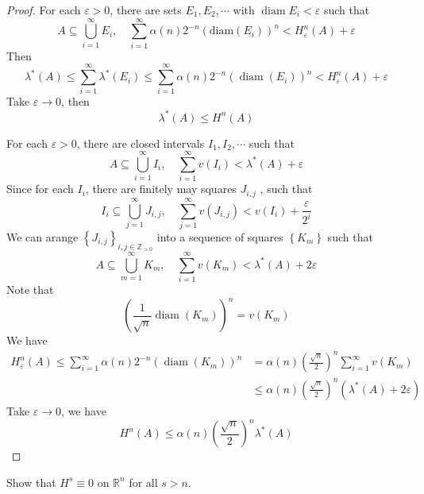 \documentclass[../main.tex]{subfiles}
\begin{document}
\begin{proof}
    For each \(   \varepsilon > 0  \), there are  sets \(  E_1,E_2,\cdots   \) with \(  \operatorname{diam}E_{i}<  \varepsilon   \) such that \[
    A\subseteq \bigcup _{i= 1}^{\infty}E_{i},\quad \sum _{i= 1}^{\infty}\alpha \left( n \right) 2^{-n} \left( \mathrm{diam} \left( E_{i} \right)   \right)^{n}< H_{ \varepsilon }^{n}\left( A \right)+  \varepsilon   
    \] Then\[
     \lambda ^{*}\left( A \right)\le \sum _{i= 1}^{\infty} \lambda ^{*}\left( E_{i} \right)\le \sum _{i= 1}^{\infty}\alpha \left( n \right)2^{-n} \left( \operatorname{diam}\left( E_{i} \right)  \right)^{n}    < H_{ \varepsilon }^{n}\left( A \right)+  \varepsilon  
    \]Take \(   \varepsilon \to 0  \), then \[
     \lambda ^{*}\left( A \right)\le H^{n}\left( A \right)  
    \] 

    For each \(   \varepsilon > 0  \), there are closed intervals \(  I_1,I_2,\cdots   \) such that  \[
    A\subseteq \bigcup _{i= 1}^{\infty}I_{i},\quad \sum _{i= 1}^{\infty}v\left( I_{i} \right)<  \lambda ^{*}\left( A \right)+  \varepsilon   
    \] Since for each \(  I_{i}  \), there are finitely may squares \(  J_{i,j}  \) ,   such that    \[
    I_{i}\subseteq \bigcup _{j= 1}^{\infty}J_{i,j},\quad    \sum _{j= 1}^{\infty}v\left( J_{i,j} \right)< v\left( I_{i} \right)+ \frac{ \varepsilon  }{2^{i} }   
    \] We can arange \(  \left\{ J_{i,j} \right\}_{i,j\in \mathbb{Z} _{> 0}}  \) into a sequence of  squares \(  \left\{ K_{m} \right\}  \) such that \[
    A\subseteq \bigcup _{m= 1}^{\infty}K_{m},\quad \sum _{i= 1}^{\infty}v\left( K_{m} \right)<  \lambda ^{*}\left( A \right)+ 2 \varepsilon   
    \] Note that \[\left( 
\frac{1}{\sqrt{n}}    \operatorname{diam}\left( K_{m} \right)  \right)^{n}= v\left( K_{m} \right)  
    \] We have \[
  \begin{aligned}
    H_{ \varepsilon }^{n}\left( A \right)\le \sum _{i= 1}^{\infty} \alpha \left( n \right)2^{-n} \left( \operatorname{diam}\left( K_{m} \right)  \right)^{n}&= \alpha\left( n \right)\left( \frac{\sqrt{n} }{2 }  \right)^{n}   \sum _{i= 1}^{\infty}v\left( K_{m} \right)   \\ 
     &\le \alpha \left( n \right)\left( \frac{\sqrt{n} }{2 }  \right)^{n}  \left(  \lambda ^{*}\left( A \right)+ 2 \varepsilon   \right) 
  \end{aligned}
    \] Take \(   \varepsilon \to 0  \), we have \[
    H^{n}\left( A \right)\le \alpha \left( n \right)\left( \frac{\sqrt{n} }{2 }  \right)^{n} \lambda ^{*}\left( A \right)    
    \] 
\end{proof}
\begin{exercise}{}{}
    Show that \(  H^{s}\equiv 0  \) on \(  \mathbb{R} ^{n}  \) for all \(  s> n  \).   
\end{exercise}
\end{document}
